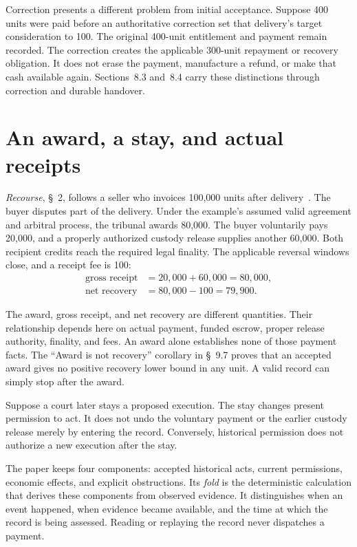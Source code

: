 \documentclass{momentum}
\begin{document}
Correction presents a different problem from initial acceptance. Suppose 400 units were paid before an authoritative correction set that delivery's target consideration to 100. The original 400-unit entitlement and payment remain recorded. The correction creates the applicable 300-unit repayment or recovery obligation. It does not erase the payment, manufacture a refund, or make that cash available again. Sections~8.3 and~8.4 carry these distinctions through correction and durable handover.

\section{An award, a stay, and actual receipts}

\emph{Recourse}, \S~2, follows a seller who invoices 100,000 units after delivery~\cite{recourse}. The buyer disputes part of the delivery. Under the example's assumed valid agreement and arbitral process, the tribunal awards 80,000. The buyer voluntarily pays 20,000, and a properly authorized custody release supplies another 60,000. Both recipient credits reach the required legal finality. The applicable reversal windows close, and a receipt fee is 100:
\[
\begin{aligned}
\text{gross receipt}&=20{,}000+60{,}000=80{,}000,\\
\text{net recovery}&=80{,}000-100=79{,}900.
\end{aligned}
\]

The award, gross receipt, and net recovery are different quantities. Their relationship depends here on actual payment, funded escrow, proper release authority, finality, and fees. An award alone establishes none of those payment facts. The ``Award is not recovery'' corollary in \S~9.7 proves that an accepted award gives no positive recovery lower bound in any unit. A valid record can simply stop after the award.

Suppose a court later stays a proposed execution. The stay changes present permission to act. It does not undo the voluntary payment or the earlier custody release merely by entering the record. Conversely, historical permission does not authorize a new execution after the stay.

The paper keeps four components: accepted historical acts, current permissions, economic effects, and explicit obstructions. Its \emph{fold} is the deterministic calculation that derives these components from observed evidence. It distinguishes when an event happened, when evidence became available, and the time at which the record is being assessed. Reading or replaying the record never dispatches a payment.
\end{document}
